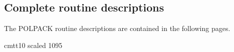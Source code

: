 \subsection{Complete routine descriptions \label{descriptions}}

The POLPACK routine descriptions are contained in the following pages.











\newlength{\sstbannerlength}
\newlength{\sstcaptionlength}
\newlength{\sstexampleslength}
\newlength{\sstexampleswidth}

\newfont{\ssttt} {cmtt10 scaled 1095}

